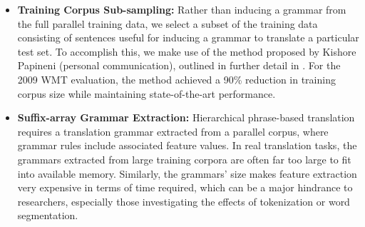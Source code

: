 \documentclass[11pt]{article}
\newcommand{\ignore}[1]{}
\begin{document}
\begin{itemize}
\item \textbf{Training Corpus Sub-sampling:} Rather than inducing a grammar from the full parallel training data, we select a subset of the training data consisting of sentences useful for inducing a grammar to translate a particular test set. To accomplish this, we make use of the method proposed by Kishore Papineni (personal communication), outlined in further detail in \cite{Joshua-WMT}. For the 2009 WMT evaluation, the method achieved a 90\% reduction in training corpus size while maintaining state-of-the-art performance.


\item \textbf{Suffix-array Grammar Extraction:} Hierarchical phrase-based translation requires a translation grammar extracted from a parallel corpus, where grammar rules include associated feature values. In real translation tasks, the grammars extracted from large training corpora are often far too large to fit into available memory. Similarly, the grammars' size makes feature extraction very expensive in terms of time required, which can be a major hindrance to researchers, especially those investigating the effects of tokenization or word segmentation.


\end{itemize}
\end{document}
